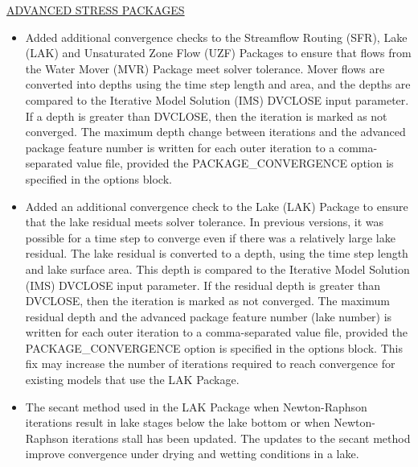 
	\underline{ADVANCED STRESS PACKAGES}
	\begin{itemize}
		\item Added additional convergence checks to the Streamflow Routing (SFR), Lake (LAK) and Unsaturated Zone Flow (UZF) Packages to ensure that flows from the Water Mover (MVR) Package meet solver tolerance.  Mover flows are converted into depths using the time step length and area, and the depths are compared to the Iterative Model Solution (IMS) DVCLOSE input parameter.  If a depth is greater than DVCLOSE, then the iteration is marked as not converged.  The maximum depth change between iterations and the advanced package feature number is written for each outer iteration to a comma-separated value file, provided the PACKAGE\_CONVERGENCE option is specified in the options block.
		\item Added an additional convergence check to the Lake (LAK) Package to ensure that the lake residual meets solver tolerance. In previous versions, it was possible for a time step to converge even if there was a relatively large lake residual. The lake residual is converted to a depth, using the time step length and lake surface area. This depth is compared to the Iterative Model Solution (IMS) DVCLOSE input parameter. If the residual depth is greater than DVCLOSE, then the iteration is marked as not converged. The maximum residual depth and the advanced package feature number (lake number) is written for each outer iteration to a comma-separated value file, provided the PACKAGE\_CONVERGENCE option is specified in the options block. This fix may increase the number of iterations required to reach convergence for existing models that use the LAK Package.
		\item The secant method used in the LAK Package when Newton-Raphson iterations result in lake stages below the lake bottom or when Newton-Raphson iterations stall has been updated. The updates to the secant method improve convergence under drying and wetting conditions in a lake. 		
	\end{itemize}

